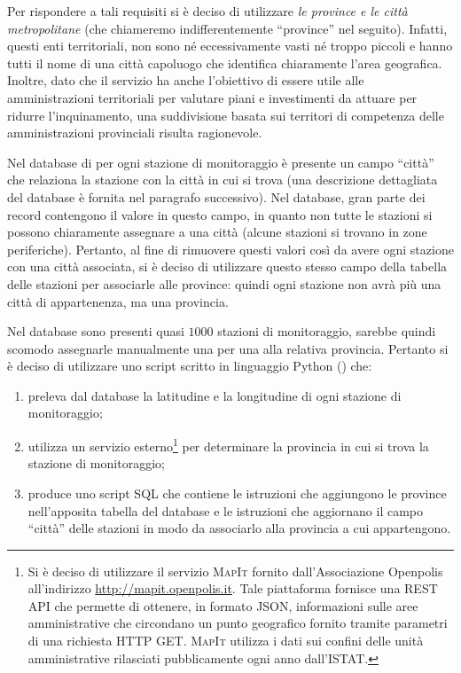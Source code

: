 Per rispondere a tali requisiti si è deciso di utilizzare \emph{le province e le
città metropolitane} (che chiameremo indifferentemente ``province'' nel
seguito).  Infatti, questi enti territoriali, non sono né eccessivamente vasti
né troppo piccoli e hanno tutti il nome di una città capoluogo che identifica
chiaramente l'area geografica. Inoltre, dato che il servizio ha anche
l'obiettivo di essere utile alle amministrazioni territoriali per valutare piani
e investimenti da attuare per ridurre l'inquinamento, una suddivisione basata
sui territori di competenza delle amministrazioni provinciali risulta
ragionevole.

Nel database di \MonIQA{} per ogni stazione di monitoraggio è presente un campo
 ``città'' che relaziona la stazione con la città in cui si trova
(una descrizione dettagliata del database è fornita nel paragrafo successivo).
Nel database, gran parte dei record contengono il valore  in questo
campo, in quanto non tutte le stazioni si possono chiaramente assegnare a una
città (alcune stazioni si trovano in zone periferiche). Pertanto, al fine di
rimuovere questi valori  così da avere ogni stazione con una città
associata, si è deciso di utilizzare questo stesso campo della tabella delle
stazioni per associarle alle province: quindi ogni stazione non avrà più una
città di appartenenza, ma una provincia.

Nel database sono presenti quasi \(1000\) stazioni di monitoraggio, sarebbe
quindi scomodo assegnarle manualmente una per una alla relativa provincia.
Pertanto si è deciso di utilizzare uno script scritto in linguaggio Python
() che:
\begin{enumerate}
	\item preleva dal database la latitudine e la longitudine di ogni
		stazione di monitoraggio;
	\item utilizza un servizio esterno\footnote{Si è deciso di utilizzare il
		servizio \textsc{MapIt} fornito dall'Associazione Openpolis
		all'indirizzo \url{http://mapit.openpolis.it}.  Tale piattaforma
		fornisce una REST API che permette di ottenere, in formato JSON,
		informazioni sulle aree amministrative che circondano un punto
		geografico fornito tramite parametri di una richiesta HTTP
		GET\@. \textsc{MapIt} utilizza i dati sui confini delle unità
		amministrative rilasciati pubblicamente ogni anno dall'ISTAT.}
		per determinare la provincia in cui si trova la stazione di
		monitoraggio;
	\item produce uno script SQL che contiene le istruzioni 
		che aggiungono le province nell'apposita tabella del database e
		le istruzioni  che aggiornano il campo ``città''
		delle stazioni in modo da associarlo alla provincia a cui
		appartengono.
\end{enumerate}


